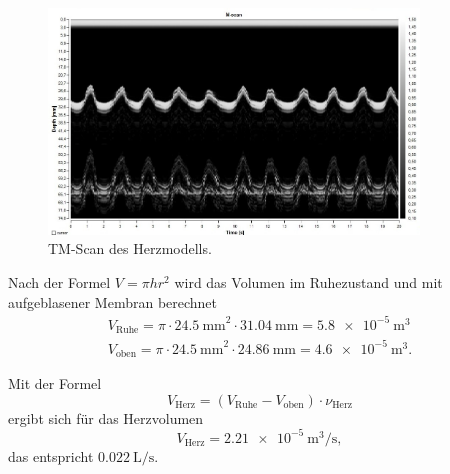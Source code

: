 \begin{figure}[H]
  \centering
  \includegraphics[height=6cm]{Herz.jpg}
  \caption{TM-Scan des Herzmodells.}
  \label{fig:Herz}
\end{figure}

Nach der Formel $V=\pi h r^{2}$ wird das Volumen im Ruhezustand und mit
aufgeblasener Membran berechnet
\begin{align*}
  V_{\text{Ruhe}}= \pi\cdot\SI{24,5}{\mm}^{2}\cdot\SI{31,04}{\mm}=\SI{5,8e-5}{\m^{3}}\\
  V_{\text{oben}}= \pi\cdot\SI{24,5}{\mm}^{2}\cdot\SI{24,86}{\mm}=\SI{4,6e-5}{\m^{3}}.
\end{align*}

Mit der Formel
\begin{equation}
  V_{\text{Herz}}=(V_{\text{Ruhe}}-V_{\text{oben}})\cdot\nu_{\text{Herz}}
\end{equation}
ergibt sich für das Herzvolumen
\begin{equation}
  V_{\text{Herz}}=\SI{2,21e-5}{\m^{3}\per\s},
\end{equation}
das entspricht $\SI{0,022}{\liter\per\s}$.
